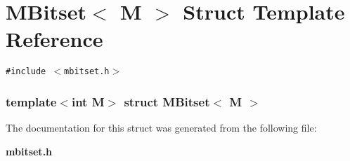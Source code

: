 \section{MBitset$<$ M $>$ Struct Template Reference}
\label{structMBitset}
{\tt \#include $<$mbitset.h$>$}

\subsubsection*{template$<$int M$>$ struct MBitset$<$ M $>$}



The documentation for this struct was generated from the following file:\begin{CompactItemize}
\item 
{\bf mbitset.h}\end{CompactItemize}
